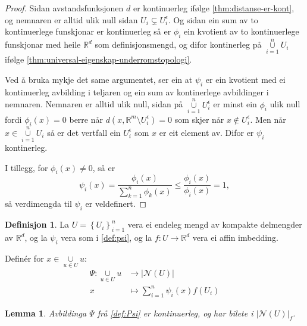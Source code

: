 \documentclass[a4paper, 12pt, norsk]{article}
\theoremstyle{plain}
\newtheorem{lemma}[theorem]{Lemma}
\theoremstyle{definition}
\newtheorem{definition}[theorem]{Definisjon}
\newcommand{\Rb}{\mathbb{R}}
\newcommand{\Nc}{\mathcal{N}}
\newcommand{\union}{ \mathop{\cup}\limits }
\newcommand{\gr}[1]{ \lvert #1 \rvert } %
\newcommand{\set}[1]{ \left\{ #1 \right\} } %
\begin{document}
\begin{proof} 
	Sidan avstandsfunksjonen \( d \) er kontinuerleg ifølge \autoref{thm:distanse-er-kont}, og nemnaren er alltid ulik null sidan \( U_i \subsetneq U_i^\epsilon \). Og sidan ein sum av to kontinuerlege funskjonar er kontinuerleg så er \( \phi_i \) ein kvotient av to kontinuerlege funskjonar med heile \( \Rb^d \) som definisjonsmengd, og difor kontinerleg på \( \union_{i=1}^n U_i \) ifølge \autoref{thm:universal-eigenskap-underromstopologi}.

	Ved å bruka mykje det same argumentet, ser ein at \( \psi_i \) er ein kvotient med ei kontinuerleg avbilding i teljaren og ein sum av kontinerlege avbildinger i nemnaren. Nemnaren er alltid ulik null, sidan på \( \union_{i=1}^n U_i^\epsilon \) er minst ein \( \phi_i \) ulik null fordi \( \phi_i(x)=0 \) berre når \( d(x, \Rb^m \setminus U_i^\epsilon)=0 \) som skjer når \( x \not\in U_i^\epsilon \). Men når \( x \in \union_{i=1}^n U_i \) så er det vertfall ein \( U_i^\epsilon \) som \( x \) er eit element av. Difor er \( \psi_i \) kontinerleg.

	I tillegg, for \( \phi_i(x) \neq 0 \), så er
	\[
		\psi_i(x) = \frac{\phi_i(x)}{\sum_{k=1}^n \phi_k(x)} \leq \frac{\phi_i(x)}{\phi_i(x)} = 1,
	\]
	så verdimengda til \( \psi_i \) er veldefinert.
\end{proof}

\begin{definition} \label{def:Psi}
	La \( U = \set{U_i}_{i=1}^n \) vera ei endeleg mengd av kompakte delmengder av \( \Rb^d \), og la \( \psi_i \) vera som i \autoref{def:psi}, og la \( f: U \to \Rb^d \) vera ei affin imbedding. 
	
	Definér for \( x \in \union_{u \in U} u \):
	\begin{align*}
		\Psi : \union_{u \in U} u &\to \gr{\Nc(U)} \\
		x &\mapsto \sum_{i=1}^n \psi_i(x)f(U_i)
	\end{align*}
\end{definition}

\begin{lemma} \label{thm:psi-kont}
	Avbildinga \( \Psi \) frå \autoref{def:Psi} er kontinuerleg, og har bilete i \( \gr{\Nc(U)}_f \).
\end{lemma}
\end{document}
